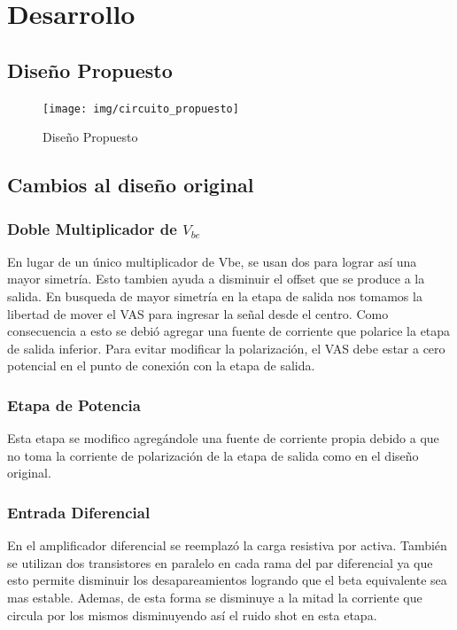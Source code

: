 \documentclass[a4paper,12pt,twoside]{article}
\begin{document}
\newpage
\section{Desarrollo}
\subsection{Diseño Propuesto}
\begin{figure}[H]
	\centering
	\texttt{[image: img/circuito\_propuesto]}
	\caption{Diseño Propuesto}
	\label{diseniopropuesto}
\end{figure}
\subsection{Cambios al diseño original}

\subsubsection{Doble Multiplicador de $V_{be}$}
En lugar de un único multiplicador de Vbe, se usan dos para lograr así una mayor simetría. Esto tambien ayuda a disminuir el offset que se produce a la salida. En busqueda de mayor simetría en la etapa de salida nos tomamos la libertad de mover el VAS para ingresar la señal desde el centro. Como consecuencia a esto se debió agregar una fuente de corriente que polarice la etapa de salida inferior. Para evitar modificar la polarización, el VAS debe estar a cero potencial en el punto de conexión con la etapa de salida.

\subsubsection{Etapa de Potencia}
Esta etapa se modifico agregándole una fuente de corriente propia debido a que no toma la corriente de polarización de la etapa de salida como en el diseño original.

\subsubsection{Entrada Diferencial}
En el amplificador diferencial se reemplazó la carga resistiva por activa. También se utilizan dos transistores en paralelo en cada rama del par diferencial ya que esto permite disminuir los desapareamientos logrando que el beta equivalente sea mas estable. Ademas, de esta forma se disminuye a la mitad la corriente que circula por los mismos disminuyendo así el ruido shot en esta etapa.
 
\end{document}
